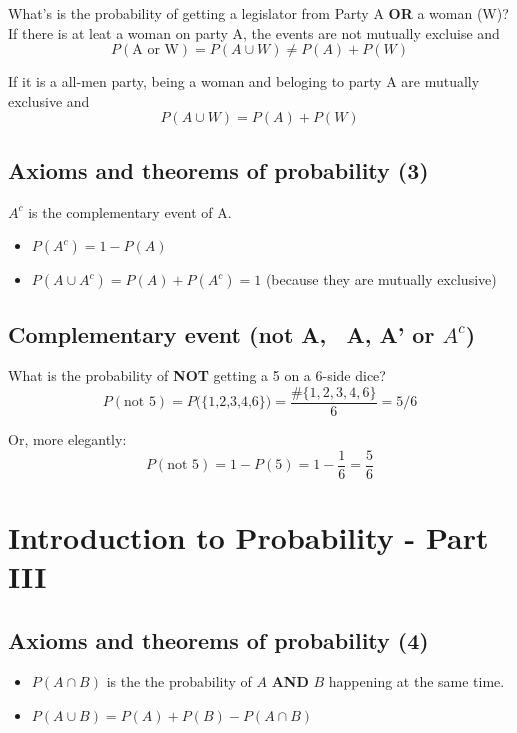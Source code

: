 \documentclass[11pt]{article}
\begin{document}
	What's is the probability of getting a legislator from Party A \textbf{OR} a woman (W)?\\
	
	If there is at leat a woman on party A, the events are not mutually excluise and \[P(\text{A or W}) = P(A \cup W) \neq P(A) + P(W)\]
	
	If it is a all-men party, being a woman and beloging to party A are mutually exclusive and
	\[P(A \cup W) = P(A) + P(W)\]


	\subsection{Axioms and theorems of probability (3)}
	$A^c$ is the complementary event of A.
	\begin{itemize}
		\item  $P(A^c) = 1 - P(A)$
		\item  $P(A \cup A^c) = P(A) + P(A^c) = 1$ (because they are mutually exclusive)
	\end{itemize}


	\subsection{Complementary event (not A, ~A, A' or $A^c$)}
	What is the probability of \textbf{NOT} getting a 5 on a 6-side dice?
	\[P(\text{not 5}) = P\text{(\{1,2,3,4,6\})} = \frac{\#\{1, 2, 3, 4, 6\}}{6} =  5/6	\]

	Or, more elegantly:
	\[P(\text{not 5}) = 1 - P(5) = 1 - \frac{1}{6} = \frac{5}{6}\]

\pagebreak
\section{Introduction to Probability - Part III}

	\subsection{Axioms and theorems of probability (4)}
	\begin{itemize}
		\item $P(A \cap B)$ is the the probability of $A$ \textbf{AND} $B$ happening at the same time.																																																																																																																		
		\item  $P(A \cup B) = P(A) + P(B) - P(A \cap B)$ 
	\end{itemize}
\end{document}

